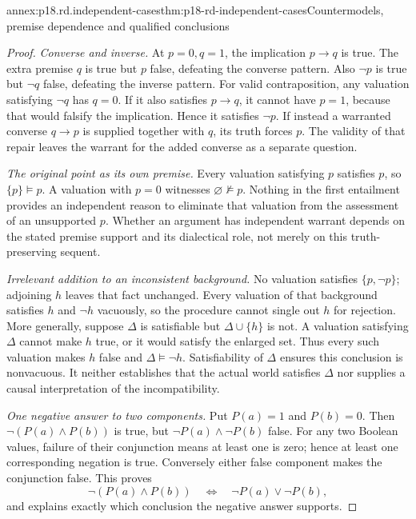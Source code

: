 \begin{annexitem}{annex:p18.rd.independent-cases}{thm:p18-rd-independent-cases}{Countermodels, premise dependence and qualified conclusions}
\begin{proof}
\emph{Converse and inverse.} At \(p=0,q=1\), the implication
\(p\to q\) is true. The extra premise \(q\) is true but
\(p\) false, defeating the converse pattern. Also \(\neg p\)
is true but \(\neg q\) false, defeating the inverse pattern.
For valid contraposition, any valuation satisfying \(\neg q\)
has \(q=0\). If it also satisfies \(p\to q\), it cannot
have \(p=1\), because that would falsify the implication. Hence
it satisfies \(\neg p\). If instead a warranted converse
\(q\to p\) is supplied together with \(q\), its truth
forces \(p\). The validity of that repair leaves the warrant
for the added converse as a separate question.

\emph{The original point as its own premise.} Every valuation
satisfying \(p\) satisfies \(p\), so
\(\{p\}\models p\). A valuation with \(p=0\) witnesses
\(\varnothing\not\models p\). Nothing in the first entailment
provides an independent reason to eliminate that valuation from the
assessment of an unsupported \(p\). Whether an argument has
independent warrant depends on the stated premise support and its
dialectical role, not merely on this truth-preserving sequent.

\emph{Irrelevant addition to an inconsistent background.} No valuation
satisfies \(\{p,\neg p\}\); adjoining \(h\) leaves that
fact unchanged. Every valuation of that background satisfies \(h\)
and \(\neg h\) vacuously, so the procedure cannot single out
\(h\) for rejection. More generally, suppose \(\Delta\)
is satisfiable but \(\Delta\cup\{h\}\) is not. A valuation
satisfying \(\Delta\) cannot make \(h\) true, or it would
satisfy the enlarged set. Thus every such valuation makes \(h\)
false and \(\Delta\models\neg h\). Satisfiability of
\(\Delta\) ensures this conclusion is nonvacuous. It neither
establishes that the actual world satisfies \(\Delta\) nor
supplies a causal interpretation of the incompatibility.

\emph{One negative answer to two components.} Put \(P(a)=1\)
and \(P(b)=0\). Then \(\neg(P(a)\land P(b))\) is true,
but \(\neg P(a)\land\neg P(b)\) false. For any two
Boolean values, failure of their conjunction means at least one is
zero; hence at least one corresponding negation is true. Conversely
either false component makes the conjunction false. This proves
\[
 \neg(P(a)\land P(b))\quad\Longleftrightarrow\quad
 \neg P(a)\lor\neg P(b),
\]
and explains exactly which conclusion the negative answer supports.
\end{proof}
\end{annexitem}
